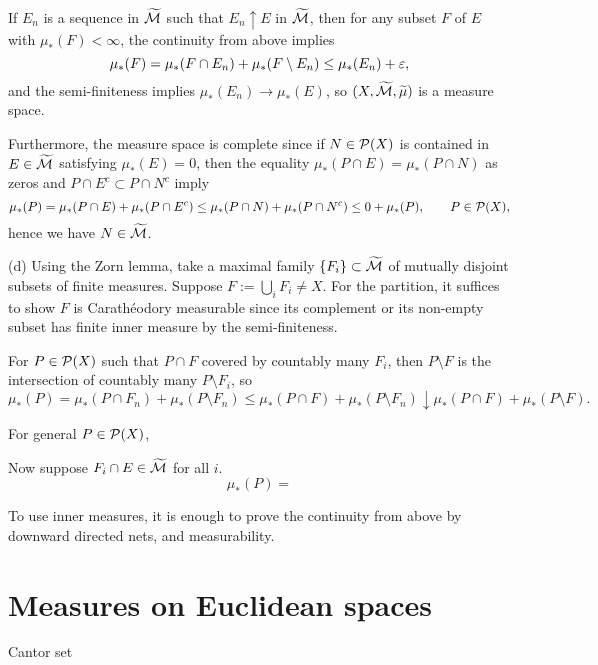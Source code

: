 \documentclass{../../large}
\begin{document}
\begin{pf}
If $E_n$ is a sequence in $\widetilde{\mathcal{M}}$ such that $E_n\uparrow E$ in $\widetilde{\mathcal{M}}$, then for any subset $F$ of $E$ with $\mu_*(F)<\infty$, the continuity from above implies
\[\mu_*(F)=\mu_*(F\cap E_n)+\mu_*(F\setminus E_n)\le\mu_*(E_n)+\varepsilon,\]
and the semi-finiteness implies $\mu_*(E_n)\to\mu_*(E)$, so $(X,\widetilde{\mathcal{M}},\widetilde\mu)$ is a measure space.

Furthermore, the measure space is complete since if $N\in\mathcal{P}(X)$ is contained in $E\in\widetilde{\mathcal{M}}$ satisfying $\mu_*(E)=0$, then the equality $\mu_*(P\cap E)=\mu_*(P\cap N)$ as zeros and $P\cap E^c\subset P\cap N^c$ imply
\[\mu_*(P)=\mu_*(P\cap E)+\mu_*(P\cap E^c)\le\mu_*(P\cap N)+\mu_*(P\cap N^c)\le0+\mu_*(P),\qquad P\in\mathcal{P}(X),\]
hence we have $N\in\widetilde{\mathcal{M}}$.

(d)
Using the Zorn lemma, take a maximal family $\{F_i\}\subset\widetilde{\mathcal{M}}$ of mutually disjoint subsets of finite measures.
Suppose $F:=\bigcup_iF_i\ne X$.
For the partition, it suffices to show $F$ is Carath\'eodory measurable since its complement or its non-empty subset has finite inner measure by the semi-finiteness.

For $P\in\mathcal{P}(X)$ such that $P\cap F$ covered by countably many $F_i$, then $P\setminus F$ is the intersection of countably many $P\setminus F_i$, so
\[\mu_*(P)=\mu_*(P\cap F_n)+\mu_*(P\setminus F_n)\le\mu_*(P\cap F)+\mu_*(P\setminus F_n)\downarrow\mu_*(P\cap F)+\mu_*(P\setminus F).\]

For general $P\in\mathcal{P}(X)$,



Now suppose $F_i\cap E\in\widetilde{\mathcal{M}}$ for all $i$.
\[\mu_*(P)=\]
\end{pf}

To use inner measures, it is enough to prove the continuity from above by downward directed nets, and measurability.


\section{Measures on Euclidean spaces}

Cantor set

\begin{prb}
\end{prb}
\end{document}
